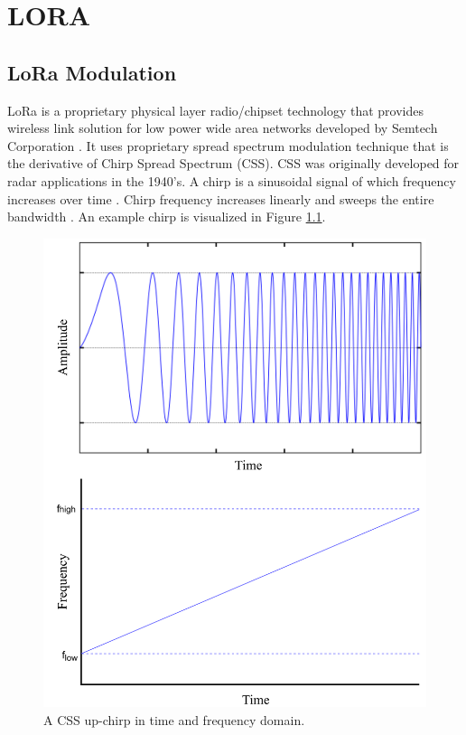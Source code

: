 \chapter{LORA}\label{ch:lora_lorawan}

\section{LoRa Modulation}

LoRa is a proprietary physical layer radio/chipset technology that provides wireless link solution for low power wide area networks developed by Semtech Corporation \cite{semtech}. It uses proprietary spread spectrum modulation technique that is the derivative of Chirp Spread Spectrum (CSS). CSS was originally developed for radar applications in the 1940’s. A chirp is a sinusoidal signal of which frequency increases over time \cite{1091721}. Chirp frequency increases linearly and sweeps the entire bandwidth \cite{AN1200.22}. An example chirp is visualized in Figure \ref{fig:lora_chirp}.

\begin{figure}[h]
\centering
\includegraphics[width=.7\linewidth]{fig/lora_chirp.png}
\vspace*{5mm}
\caption{A CSS up-chirp in time and frequency domain. \cite{sghoslya_lora}}
\label{fig:lora_chirp}
\end{figure}

